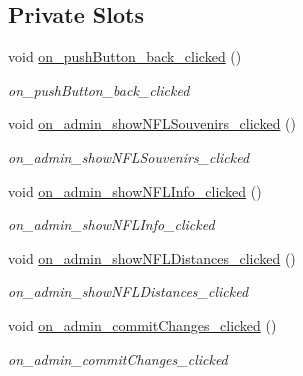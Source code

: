 \subsection*{Private Slots}
\begin{DoxyCompactItemize}
\item 
\mbox{\label{classadmin_a7913f6187f2b52078e26535f01fcfb7a}} 
void \hyperlink{classadmin_a7913f6187f2b52078e26535f01fcfb7a}{on\+\_\+push\+Button\+\_\+back\+\_\+clicked} ()
\begin{DoxyCompactList}\small\item\em on\+\_\+push\+Button\+\_\+back\+\_\+clicked \end{DoxyCompactList}\item 
\mbox{\label{classadmin_aaba52ea36980ead5360194b1bef3a111}} 
void \hyperlink{classadmin_aaba52ea36980ead5360194b1bef3a111}{on\+\_\+admin\+\_\+show\+N\+F\+L\+Souvenirs\+\_\+clicked} ()
\begin{DoxyCompactList}\small\item\em on\+\_\+admin\+\_\+show\+N\+F\+L\+Souvenirs\+\_\+clicked \end{DoxyCompactList}\item 
\mbox{\label{classadmin_af786bdec99f8c74c3937f75d700e0435}} 
void \hyperlink{classadmin_af786bdec99f8c74c3937f75d700e0435}{on\+\_\+admin\+\_\+show\+N\+F\+L\+Info\+\_\+clicked} ()
\begin{DoxyCompactList}\small\item\em on\+\_\+admin\+\_\+show\+N\+F\+L\+Info\+\_\+clicked \end{DoxyCompactList}\item 
\mbox{\label{classadmin_a321b19c2927b24de90073fc6a00ad394}} 
void \hyperlink{classadmin_a321b19c2927b24de90073fc6a00ad394}{on\+\_\+admin\+\_\+show\+N\+F\+L\+Distances\+\_\+clicked} ()
\begin{DoxyCompactList}\small\item\em on\+\_\+admin\+\_\+show\+N\+F\+L\+Distances\+\_\+clicked \end{DoxyCompactList}\item 
\mbox{\label{classadmin_a0d73f416371cb1a10a9592a186e7b5af}} 
void \hyperlink{classadmin_a0d73f416371cb1a10a9592a186e7b5af}{on\+\_\+admin\+\_\+commit\+Changes\+\_\+clicked} ()
\begin{DoxyCompactList}\small\item\em on\+\_\+admin\+\_\+commit\+Changes\+\_\+clicked \end{DoxyCompactList}\item 

\end{DoxyCompactItemize}
